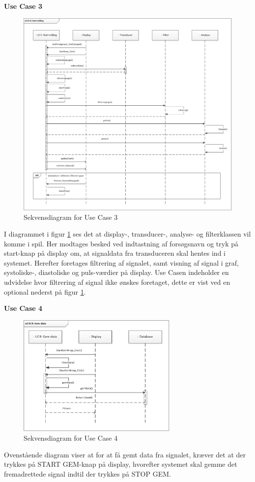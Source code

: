 \textbf{Use Case 3}
\begin{figure}[H]
	\centering
	\includegraphics[width=1.0\textwidth]{Figurer/UC3}
	\caption{Sekvensdiagram for Use Case 3}
	\label{fig:Sekvensdiagram_UC_3}
\end{figure}
I diagrammet i figur \ref{fig:Sekvensdiagram_UC_3} ses det at display-, transducer-, analyse- og filterklassen vil komme i spil. Her modtages besked ved indtastning af forsøgsnavn og tryk på start-knap på display om, at signaldata fra transduceren skal hentes ind i systemet. Herefter foretages filtrering af signalet, samt visning af signal i graf, systoliske-, diastoliske og puls-værdier på display. Use Casen indeholder en udvidelse hvor filtrering af signal ikke ønskes foretaget, dette er vist ved en optional nederst på figur \ref{fig:Sekvensdiagram_UC_3}. 

\textbf{Use Case 4}
\begin{figure}[H]
	\centering
	\includegraphics[width=0.7\textwidth]{Figurer/UC4}
	\caption{Sekvensdiagram for Use Case 4}
	\label{fig:Sekvensdiagram_UC_4}
\end{figure}
Ovenstående diagram viser at for at få gemt data fra signalet, kræver det at der trykkes på START GEM-knap på display, hvorefter systemet skal gemme det fremadrettede signal indtil der trykkes på STOP GEM.


